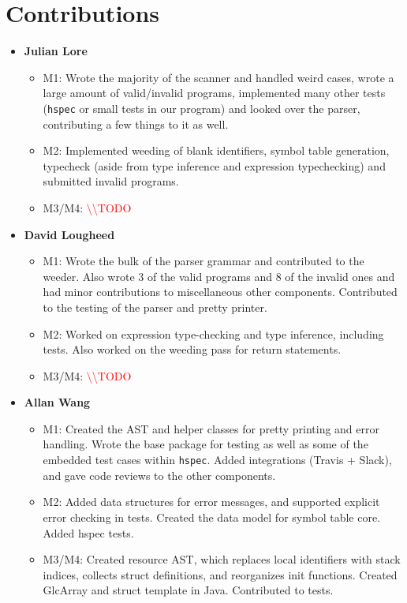 \documentclass[11pt]{article}
\newcommand{\todo}[0]{\textcolor{red}{\textbackslash\textbackslash TODO \ }}
\begin{document}
\section{Contributions}
\begin{itemize}
	\item \textbf{Julian Lore}
	\begin{itemize}
		\item M1: Wrote the majority of the scanner and
		handled weird cases, wrote a large amount of valid/invalid programs,
		implemented many other tests (\texttt{hspec} or small tests in our
		program) and looked over the parser, contributing a few things to it
		as well.
		\item M2: Implemented weeding of blank identifiers,
		symbol table generation, typecheck (aside from type inference and
		expression typechecking) and submitted invalid programs.
		\item M3/M4: \todo
	\end{itemize}
	\item \textbf{David Lougheed}
	\begin{itemize}
		\item M1: Wrote the bulk of the parser grammar
		and contributed to the weeder. Also wrote 3 of the valid programs
		and 8 of the invalid ones and had minor contributions to
		miscellaneous other components.  Contributed to the testing of the
		parser and pretty printer.
		\item M2: Worked on expression type-checking and
		type inference, including tests. Also worked on the weeding pass for
		return statements.
		\item M3/M4: \todo 
	\end{itemize}
	\item \textbf{Allan Wang}
	\begin{itemize}
		\item M1: Created the AST and helper classes for
		pretty printing and error handling.  Wrote the base package for
		testing as well as some of the embedded test cases within
		\texttt{hspec}.  Added integrations (Travis + Slack), and gave code
		reviews to the other components.
		\item M2: Added data structures for error messages,
		and supported explicit error checking in tests. Created the data
		model for symbol table core. Added hspec tests.
		\item M3/M4: Created resource AST, which replaces local identifiers with stack indices, collects struct definitions, and reorganizes init functions. Created GlcArray and struct template in Java. Contributed to tests.
	\end{itemize}
\end{itemize}

\newpage

 
\end{document}
